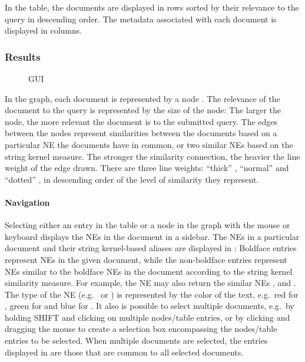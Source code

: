In the table, the documents are displayed in rows sorted by their relevance to the query in descending order. The metadata associated with each document is displayed in columns.

\subsubsection{Results}
\begin{figure}[h]
\centering
\caption{GUI}
\end{figure}

In the graph, each document is represented by a node . The relevance of the document to the query is represented by the size of the node: The larger the node, the more relevant the document is to the submitted query. The edges between the nodes represent similarities between the documents based on a particular NE the documents have in common, or two similar NEs based on the string kernel measure. The stronger the similarity connection, the heavier the line weight of the edge drawn. There are three line weights: ``thick'' , ``normal''  and ``dotted'' , in descending order of the level of similarity they represent.

\paragraph{Navigation}
Selecting either an entry in the table or a node in the graph with the mouse or keyboard displays the NEs in the document in a sidebar. The NEs in a particular document and their string kernel-based aliases are displayed in : Boldface entries represent NEs in the given document, while the non-boldface entries represent NEs similar to the boldface NEs in the document according to the string kernel similarity measure. For example, the NE \textbf{} may also return the similar NEs ,  and . The type of the NE (e.g.\  or ) is represented by the color of the text, e.g.\ red for , green for  and blue for . It also is possible to select multiple documents, e.g.\ by holding SHIFT and clicking on multiple nodes/table entries, or by clicking and dragging the mouse to create a selection box encompassing the nodes/table entries to be selected. When multiple documents are selected, the entries displayed in  are those that are common to all selected documents.


